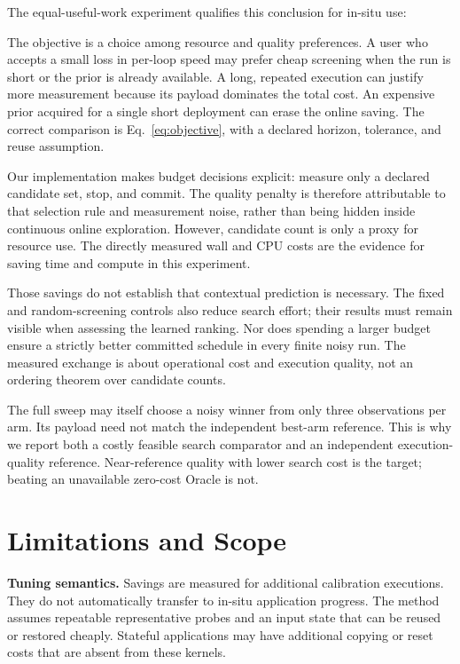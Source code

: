\documentclass[conference]{IEEEtran}
\begin{document}
\DecisionResults{}

The equal-useful-work experiment qualifies this conclusion for in-situ use:
\InsituDecision{}

The objective is a choice among resource and quality preferences. A user who
accepts a small loss in per-loop speed may prefer cheap screening when the
run is short or the prior is already available. A long, repeated execution
can justify more measurement because its payload dominates the total cost.
An expensive prior acquired for a single short deployment can erase the
online saving. The correct comparison is Eq.~\ref{eq:objective}, with a
declared horizon, tolerance, and reuse assumption.

Our implementation makes budget decisions explicit: measure only a declared
candidate set, stop, and commit. The quality penalty is therefore attributable
to that selection rule and measurement noise, rather than being hidden inside
continuous online exploration. However, candidate count is only a proxy for
resource use. The directly measured wall and CPU costs are the evidence for
saving time and compute in this experiment.

Those savings do not establish that contextual prediction is necessary.
The fixed and random-screening controls also reduce search effort; their
results must remain visible when assessing the learned ranking. Nor does
spending a larger budget ensure a strictly better committed schedule in
every finite noisy run. The measured exchange is about operational cost and
execution quality, not an ordering theorem over candidate counts.

The full sweep may itself choose a noisy winner from only three observations
per arm. Its payload need not match the independent best-arm reference.
This is why we report both a costly feasible search comparator and an
independent execution-quality reference. Near-reference quality with lower
search cost is the target; beating an unavailable zero-cost Oracle is not.

\section{Limitations and Scope}

\textbf{Tuning semantics.} Savings are measured for additional calibration
executions. They do not automatically transfer to in-situ application progress.
The method assumes repeatable representative probes and an input state that
can be reused or restored cheaply. Stateful applications may have additional
copying or reset costs that are absent from these kernels.
\end{document}
